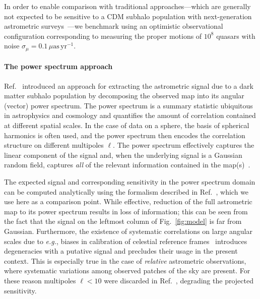 \documentclass[]{article}
\begin{document}
In order to enable comparison with traditional approaches---which are generally not expected to be sensitive to a CDM subhalo population with next-generation astrometric surveys~\cite{VanTilburg:2018ykj,Mishra-Sharma:2020ynk}---we benchmark using an optimistic observational configuration corresponding to measuring the proper motions of $10^8$ quasars with noise $\sigma_{\mu} = 0.1\,\mu\mathrm{as}\,\mathrm{yr}^{-1}$.

\paragraph{The power spectrum approach} Ref.~\cite{Mishra-Sharma:2020ynk} introduced an approach for extracting the astrometric signal due to a dark matter subhalo population by decomposing the observed map into its angular (vector) power spectrum. The power spectrum is a summary statistic ubiquitous in astrophysics and cosmology and quantifies the amount of correlation contained at different spatial scales. In the case of data on a sphere, the basis of spherical harmonics is often used, and the power spectrum then encodes the correlation structure on different multipoles $\ell$. The power spectrum effectively captures the linear component of the signal and, when the underlying signal is a Gaussian random field, captures \emph{all} of the relevant information contained in the map(s)~\cite{Tegmark:1996qt}.


The expected signal and corresponding sensitivity in the power spectrum domain can be computed analytically using the formalism described in Ref.~\cite{Mishra-Sharma:2020ynk}, which we use here as a comparison point. While effective, reduction of the full astrometric map to its power spectrum results in loss of information; this can be seen from the fact that the signal on the leftmost column of Fig.~\ref{fig:model} is far from Gaussian. Furthermore, the existence of systematic correlations on large angular scales due to \emph{e.g.}, biases in calibration of celestial reference frames~\cite{2018A&A...616A..14G} introduces degeneracies with a putative signal and precludes their usage in the present context. This is especially true in the case of \emph{relative} astrometric observations, where systematic variations among observed patches of the sky are present. For these reason multipoles $\ell < 10$ were discarded in Ref.~\cite{Mishra-Sharma:2020ynk}, degrading the projected sensitivity.
\end{document}
